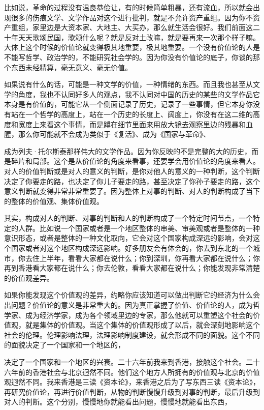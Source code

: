 \documentclass[UTF8, 12pt, a4paper]{ctexrep}
\begin{document}
比如说，革命的过程没有温良恭俭让，有的时候简单粗暴，还有流血，所以就会出现很多的伤痕文学、文学作品对这个进行批判，就是不允许资产重组。因为你不资产重组，家里边是大资本家、大地主、大买办，那么就生活会很好。我们前面这二十年天天歌颂民国，歌颂什么呢？就是反对土改嘛，就是要再来一次那个样子嘛。大体上这个时候的价值论就变得极其地重要，极其地重要。一个没有价值论的人是不能写哲学、政治学的，不能研究社会学的。因为你没有价值论的底子，你谈的那个东西未经精算，毫无意义、毫无价值。

如果说有什么的话，可能是一种文学的价值，一种情绪的东西。而且我也甚至从文学的角度，我也不认同好多人的观点，我不认同对中国的历史的某些的文学作品它本身是有价值的，可能它从一个侧面记录了历史，记录了一些事情，但它本身你没有站在一个哲学的高度上，站在一个历史的长度上、阔度上，你没有在这二维的高度和宽度上来看这个事情，而是蹲在细节里面来用放大镜去观察里边的残暴和血腥，那么你可能就不会成为类似于《复活》、成为《国家与革命》、

成为列夫·托尔斯泰那样伟大的文学作品。因为你反映的不是完整的大的历史，而是碎片和局部。这个是从价值论的角度来看事，还要学会用价值论的角度来看人。对人的价值判断或是对人的意义的判断，是你对他人的意义的一种判断，这个判断决定了你要走的路，也决定了你儿子要走的路，甚至决定了你孙子要走的路，这个意义判断就变得非常非常重要了。因为整体上对事的判断、对人的判断构成了当下的整体的价值观、集体价值观。

其实，构成对人的判断、对事的判断和人的判断构成了一个特定时间节点，一个特定的人群。比如说一个国家或者是一个地区整体的审美、审美观或者是整体的一种意识形态，或者是整体的一种文化取向，它会对这个国家构成深远的影响，会对这个国家或者对这个地区构成深远影响。好多朋友会有体会的，你去到东北的一个城市，你去住上半年，看看大家都在说什么；你到深圳，你再看大家都在说什么；你再到香港看大家都在说什么；你去伦敦，看看大家都在说什么；你能发现非常清楚的价值观差异。

如果你能发现这个价值观的差异，约略你应该知道可以做出判断它的经济为什么会出问题？价值论的意义是非常重大的。因为真正掌握了价值、价值论的人，成为哲学家、成为经济学家，成为各个领域里边的专家，那么他就可以重塑这个社会的价值观，就是集体的价值观。当这个集体的价值观形成了以后，就会深刻地影响这个社会的伦理。伦理影响法理，法理影响制度建设，就会形成不同的面貌。这个不同的面貌决定了一个国家和一个地区的，

决定了一个国家和一个地区的兴衰。二十六年前我来到香港，接触这个社会。二十六年前的香港社会与北京迥然不同。他们这个地方人所拥有的价值观与北京的价值观迥然不同。我来香港是三读《资本论》，来香港之后为了写东西三读《资本论》，再研究价值论，再进行价值判断，从物的判断慢慢升级到对事的判断，最后升级到对人的判断。这个分别，慢慢地你就能看出问题，慢慢地就能看出东西，
\end{document}
